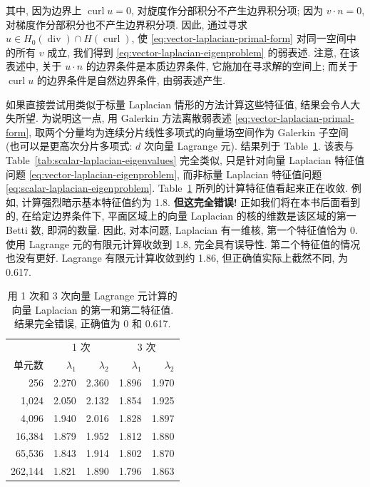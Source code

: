 其中, 因为边界上 $\operatorname{curl}u=0$, 对旋度作分部积分不产生边界积分项; 因为 $v\cdot n=0$, 对梯度作分部积分也不产生边界积分项. 因此, 通过寻求 $u\in H_0(\operatorname{div})\cap H(\operatorname{curl})$, 使 \eqref{eq:vector-laplacian-primal-form} 对同一空间中的所有 $v$ 成立, 我们得到 \eqref{eq:vector-laplacian-eigenproblem} 的弱表述. 注意, 在该表述中, 关于 $u\cdot n$ 的边界条件是本质边界条件, 它施加在寻求解的空间上; 而关于 $\operatorname{curl}u$ 的边界条件是自然边界条件, 由弱表述产生.

如果直接尝试用类似于标量 Laplacian 情形的方法计算这些特征值, 结果会令人大失所望. 为说明这一点, 用 Galerkin 方法离散弱表述 \eqref{eq:vector-laplacian-primal-form}, 取两个分量均为连续分片线性多项式的向量场空间作为 Galerkin 子空间 (也可以是更高次分片多项式: $d$ 次向量 Lagrange 元). 结果列于 Table~\ref{tab:vector-lagrange-wrong-eigenvalues}. 该表与 Table~\ref{tab:scalar-laplacian-eigenvalues} 完全类似, 只是针对向量 Laplacian 特征值问题 \eqref{eq:vector-laplacian-eigenproblem}, 而非标量 Laplacian 特征值问题 \eqref{eq:scalar-laplacian-eigenproblem}. Table~\ref{tab:vector-lagrange-wrong-eigenvalues} 所列的计算特征值看起来正在收敛. 例如, 计算强烈暗示基本特征值约为 1.8. \textbf{但这完全错误!} 正如我们将在本书后面看到的, 在给定边界条件下, 平面区域上的向量 Laplacian 的核的维数是该区域的第一 Betti 数, 即洞的数量. 因此, 对本问题, Laplacian 有一维核, 第一个特征值恰为 0. 使用 Lagrange 元的有限元计算收敛到 1.8, 完全具有误导性. 第二个特征值的情况也没有更好. Lagrange 有限元计算收敛到约 1.86, 但正确值实际上截然不同, 为 0.617.

\begin{table}[H]\centering
\caption{用 1 次和 3 次向量 Lagrange 元计算的向量 Laplacian 的第一和第二特征值. 结果完全错误, 正确值为 0 和 0.617.}\label{tab:vector-lagrange-wrong-eigenvalues}
\renewcommand{\arraystretch}{1.0}
\setlength{\tabcolsep}{12pt}
\begin{tabular}{r|rr|rr}\hline
&\multicolumn{2}{c|}{{1 次}}&\multicolumn{2}{c}{{3 次}}\\
单元数&$\lambda_1$&$\lambda_2$&$\lambda_1$&$\lambda_2$\\\hline
256&2.270&2.360&1.896&1.970\\
1,024&2.050&2.132&1.854&1.925\\
4,096&1.940&2.016&1.828&1.897\\
16,384&1.879&1.952&1.812&1.880\\
65,536&1.843&1.914&1.802&1.870\\
262,144&1.821&1.890&1.796&1.863\\\hline
\end{tabular}
\end{table}

